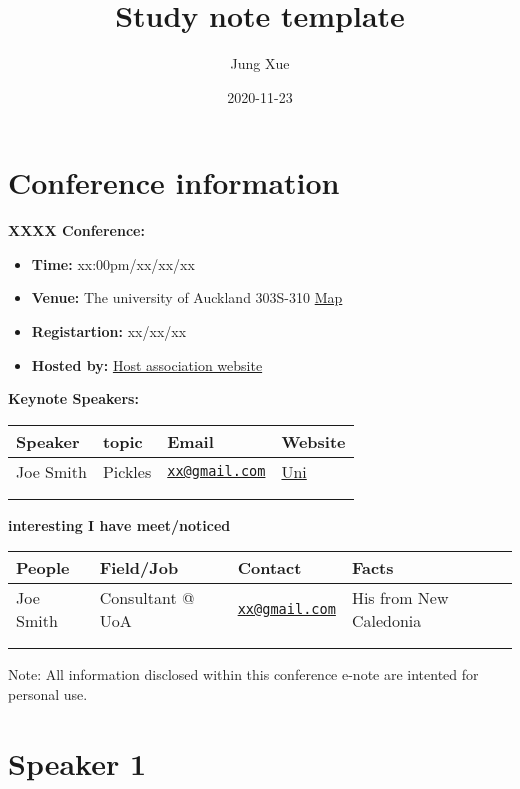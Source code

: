 \documentclass[
]{book}
\title{Study note template}
\author{Jung Xue}
\date{2020-11-23}
\providecommand{\tightlist}{%
  \setlength{\itemsep}{0pt}\setlength{\parskip}{0pt}}
\begin{document}
\maketitle

{
\setcounter{tocdepth}{1}
\tableofcontents
}
\hypertarget{conference-information}{%
\chapter*{Conference information}\label{conference-information}}

\textbf{XXXX Conference:}

\begin{itemize}
\tightlist
\item
  \textbf{Time:} xx:00pm/xx/xx/xx
\item
  \textbf{Venue:} The university of Auckland 303S-310 \href{}{Map}
\item
  \textbf{Registartion:} xx/xx/xx\\
\item
  \textbf{Hosted by:} \href{}{Host association website}
\end{itemize}

\textbf{Keynote Speakers:}

\begin{longtable}[]{@{}llll@{}}
\toprule
Speaker & topic & Email & Website\tabularnewline
\midrule
\endhead
Joe Smith & Pickles & \href{mailto:xx@gmail.com}{\nolinkurl{xx@gmail.com}} & \href{www.google.com}{Uni}\tabularnewline
& & &\tabularnewline
& & &\tabularnewline
\bottomrule
\end{longtable}

\textbf{interesting I have meet/noticed}

\begin{longtable}[]{@{}llll@{}}
\toprule
People & Field/Job & Contact & Facts\tabularnewline
\midrule
\endhead
Joe Smith & Consultant @ UoA & \href{mailto:xx@gmail.com}{\nolinkurl{xx@gmail.com}} & His from New Caledonia\tabularnewline
& & &\tabularnewline
& & &\tabularnewline
\bottomrule
\end{longtable}

Note: All information disclosed within this conference e-note are intented for personal use.

\hypertarget{speaker-1}{%
\chapter*{Speaker 1}\label{speaker-1}}
\end{document}
